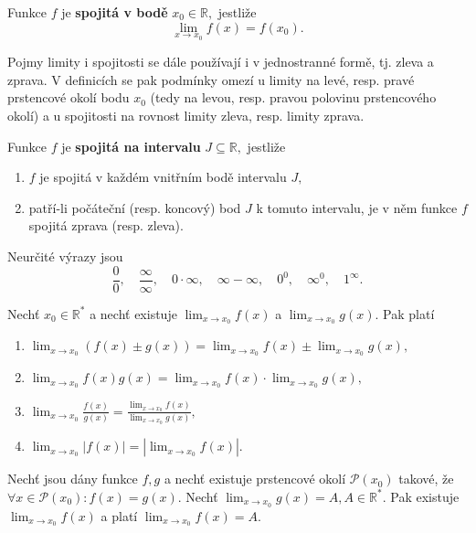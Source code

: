 \begin{definition}
Funkce $f$ je \textbf{spojitá v bodě} $x_0\in \mathbb R,$ jestliže
$$\lim_{x\to x_0}f(x)=f(x_0).$$
\end{definition}

\begin{pozn}
	Pojmy limity i spojitosti se dále používají i v jednostranné formě, tj. zleva a zprava. V definicích se pak podmínky omezí u limity na levé, resp. pravé prstencové okolí bodu $x_0$ (tedy na levou, resp. pravou polovinu prstencového okolí) a u spojitosti na rovnost limity zleva, resp. limity zprava.
\end{pozn}

\begin{definition}
Funkce $f$ je \textbf{spojitá na intervalu} $J \subseteq \mathbb R,$ jestliže
\begin{enumerate}[$i.$]
\item $f$ je spojitá v každém vnitřním bodě intervalu $J,$
\item patří-li počáteční (resp. koncový) bod $J$ k tomuto intervalu,
je v něm funkce $f$ spojitá zprava (resp. zleva).
\end{enumerate}
\end{definition}

\begin{pozn}
Neurčité výrazy jsou
$$\frac{0}{0},  \quad \frac{\infty}{\infty}, \quad 0\cdot \infty, \quad \infty - \infty, \quad0^0,\quad \infty^0,\quad 1^\infty.$$
\end{pozn}

\begin{veta}
Nechť $x_0\in \mathbb R^*$ a nechť existuje $\lim_{x\to x_0}f(x)$ a $\lim_{x\to x_0}g(x)$.
Pak platí
\begin{enumerate}[$i.$]
\item $\lim_{x\to x_0} \left ( f(x)\pm g(x) \right )= \lim_{x\to x_0}f(x) \pm \lim_{x\to x_0}g(x),$
\item $\lim_{x\to x_0}f(x)g(x)=\lim_{x\to x_0}f(x)\cdot \lim_{x\to x_0}g(x),$
\item $\lim_{x\to x_0}\frac{f(x)}{g(x)}=\frac{\lim_{x\to x_0}f(x)}{\lim_{x\to x_0}g(x)},$
\item $\lim_{x\to x_0}|f(x)| = |\lim_{x\to x_0}f(x)|.$
\end{enumerate}
\end{veta}

\begin{veta}
Nechť jsou dány funkce $f,g$ a nechť existuje prstencové okolí
$\mathscr P(x_0)$ takové, že $\forall x \in \mathscr P(x_0)\colon f(x)=g(x).$
Nechť $\lim_{x\to x_0}g(x)=A, A\in \mathbb R^*.$ Pak existuje $\lim_{x\to x_0}f(x)$
a platí $\lim_{x\to x_0}f(x)=A.$
\end{veta}

